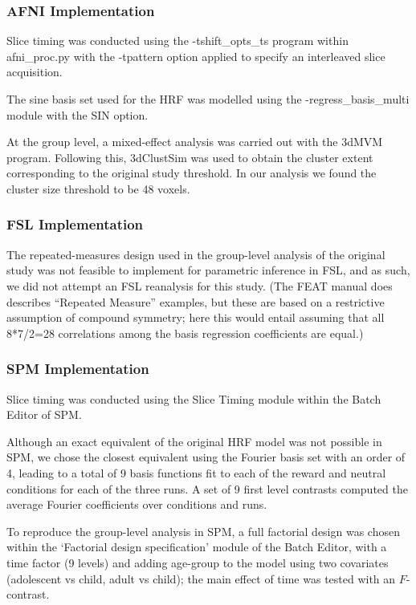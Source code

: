 \subsubsection{AFNI Implementation}
Slice timing was conducted using the -tshift\_opts\_ts program within afni\_proc.py with the -tpattern option applied to specify an interleaved slice acquisition. 

The sine basis set used for the HRF was modelled using the -regress\_basis\_multi module with the SIN option.

At the group level, a mixed-effect analysis was carried out with the 3dMVM program. Following this, 3dClustSim was used to obtain the cluster extent corresponding to the original study threshold. In our analysis we found the cluster size threshold to be 48 voxels.

\subsubsection{FSL Implementation}
The repeated-measures design used in the group-level analysis of the original study was not feasible to implement for parametric inference in FSL, and as such, we did not attempt an FSL reanalysis for this study. (The FEAT manual does describes ``Repeated Measure'' examples, but these are based on a restrictive assumption of compound symmetry; here this would entail assuming that all 8*7/2=28 correlations among the basis regression coefficients are equal.)
\subsubsection{SPM Implementation}
Slice timing was conducted using the Slice Timing module within the Batch Editor of SPM.

Although an exact equivalent of the original HRF model was not possible in SPM, we chose the closest equivalent using the Fourier basis set with an order of 4, leading to a total of 9 basis functions fit to each of the reward and neutral conditions for each of the three runs.  A set of 9 first level contrasts computed the average Fourier coefficients over conditions and runs.

To reproduce the group-level analysis in SPM, a full factorial design was chosen within the `Factorial design specification' module of the Batch Editor, with a time factor (9 levels) and adding age-group to the model using two covariates (adolescent vs child, adult vs child); the main effect of time was tested with an $F$-contrast.

